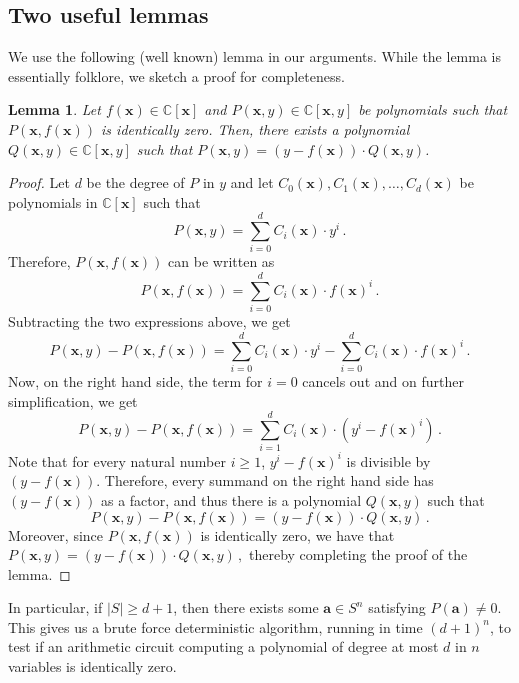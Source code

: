 \documentclass[10pt,a4paper]{article}
\newtheorem{lemma}[theorem]{Lemma}
\theoremstyle{definition}
\newcommand{\F}{\mathbb C}
\newcommand{\va}{\mathbf a}
\newcommand{\vx}{\mathbf x}
\begin{document}
\subsection{Two useful lemmas}
We use the following (well known) lemma in our arguments. While the lemma is essentially folklore, we sketch a proof for completeness. 
\begin{lemma}\label{lem:remainder}
Let $f(\vx) \in \F[\vx]$ and $P(\vx, y) \in \F[\vx, y]$ be  polynomials such that $P\left(\vx, f(\vx)\right)$  is identically zero. Then, there exists a polynomial $Q(\vx, y) \in \F[\vx, y]$ such that $P(\vx, y) = (y-f(\vx))\cdot Q(\vx, y)$. 
\end{lemma}
\begin{proof}[Proof]
Let $d$ be the degree of $P$ in $y$ and let $C_0(\vx), C_1(\vx), \ldots, C_d(\vx)$ be polynomials in $\F[\vx]$ such that 
\[
P(\vx, y) = \sum_{i = 0}^d C_i(\vx)\cdot y^i \, .
\]
Therefore, $P(\vx, f(\vx))$ can be written as 
\[
P(\vx, f(\vx)) = \sum_{i = 0}^d C_i(\vx)\cdot f(\vx)^i \, .
\]
Subtracting the two expressions above, we get 
\[
P(\vx, y) - P(\vx, f(\vx)) =  \sum_{i = 0}^d C_i(\vx)\cdot y^i  - \sum_{i = 0}^d C_i(\vx)\cdot f(\vx)^i \, .
\]
Now, on the right hand side, the term for $i = 0$ cancels out and on further simplification, we get 
\[
P(\vx, y) - P(\vx, f(\vx)) =  \sum_{i = 1}^d C_i(\vx)\cdot \left(y^i - f(\vx)^i\right)  \, .
\]
Note that for every natural number $i \geq 1$, $y^i-f(\vx)^i$ is divisible by  $(y-f(\vx))$. Therefore, every summand on the right hand side has $(y-f(\vx))$ as a factor, and thus there is a polynomial $Q(\vx, y)$ such that 
\[
P(\vx, y) - P(\vx, f(\vx)) =  (y-f(\vx))\cdot Q(\vx, y)  \, .
\]
Moreover, since $P(\vx, f(\vx))$ is identically zero, we have that $
P(\vx, y) =  (y-f(\vx))\cdot Q(\vx, y)  \, , 
$ thereby completing the proof of the lemma. 
\end{proof}
%
In particular, if $|S| \ge d+1$, then there exists some $\va \in S^n$ satisfying $P(\va) \ne 0$. 
This gives us a brute force deterministic algorithm, running in time $(d+1)^n$, to test if an arithmetic circuit computing a polynomial of degree at most $d$ in $n$ variables is identically zero.
\end{document}
